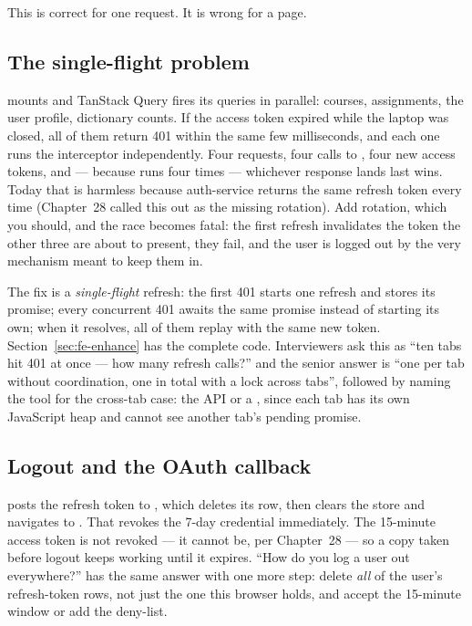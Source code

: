 This is correct for one request. It is wrong for a page.

\subsection{The single-flight problem}

 mounts and TanStack Query fires its queries in
parallel: courses, assignments, the user profile, dictionary counts.
If the access token expired while the laptop was closed, all of them
return 401 within the same few milliseconds, and each one runs the
interceptor independently. Four requests, four calls to
, four new access tokens, and --- because
 runs four times --- whichever response lands last
wins. Today that is harmless because auth-service returns the same
refresh token every time (Chapter~28 called this out as the missing
rotation). Add rotation, which you should, and the race becomes fatal:
the first refresh invalidates the token the other three are about to
present, they fail, and the user is logged out by the very mechanism
meant to keep them in.

The fix is a \emph{single-flight} refresh: the first 401 starts one
refresh and stores its promise; every concurrent 401 awaits the same
promise instead of starting its own; when it resolves, all of them
replay with the same new token. Section~\ref{sec:fe-enhance} has the
complete code. Interviewers ask this as ``ten tabs hit 401 at once ---
how many refresh calls?'' and the senior answer is ``one per tab
without coordination, one in total with a lock across tabs'', followed
by naming the tool for the cross-tab case: the  API or
a , since each tab has its own JavaScript heap
and cannot see another tab's pending promise.

\subsection{Logout and the OAuth callback}

 posts the refresh token to
, which deletes its row, then clears the store
and navigates to . That revokes the 7-day credential
immediately. The 15-minute access token is not revoked --- it cannot
be, per Chapter~28 --- so a copy taken before logout keeps working
until it expires. ``How do you log a user out everywhere?'' has the
same answer with one more step: delete \emph{all} of the user's
refresh-token rows, not just the one this browser holds, and accept
the 15-minute window or add the  deny-list.

